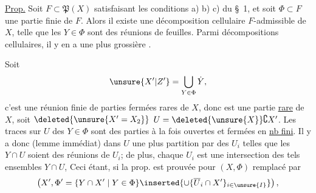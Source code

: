 

\uline{Prop.}  Soit $F\subset\mathfrak P(X)$ satisfaisant les conditions a) b) c)  du \S\ 1, et soit $\Phi\subset F$ une partie finie de $F$. Alors il existe une décomposition cellulaire $F$-admissible de $X$, telle que les $Y\in\Phi$ sont des réunions de feuilles. Parmi  décompositions cellulaires, il y en a une plus  grossière .

 Soit
\[
\unsure{X'|Z'}=\bigcup_{Y\in\Phi}\dot Y,
\]
c'est une réunion finie de parties fermées rares de $X$, donc est une partie \uline{rare} de $X$, soit $\deleted{\unsure{X'=X_2}}$ $U=\deleted{\unsure{X}}\complement X'$. Les traces  sur $U$ des $Y\in\Phi$ sont des  parties à la fois ouvertes et fermées  en \uline{nb fini}. Il y a donc (lemme  immédiat) dans $U$ une plus  partition  par des $U_i$  telles que les $Y\cap U$ soient des réunions  de $U_i$; de plus, chaque $U_i$ est une intersection  des tels ensembles $Y\cap U$,  Ceci étant, si la prop. est prouvée pour  $(X,\Phi)$ remplacé par
\[
\left(X',\Phi'=\{Y\cap X'\mid Y\in\Phi\}\inserted{\cup\{\overline U_i\cap X'\}_{i\in\unsure{I}}}\right),
\]

